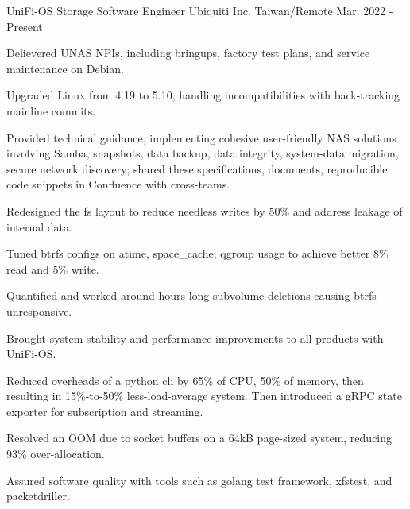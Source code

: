 

\begin{cventries}

  \cventry
    {UniFi-OS Storage Software Engineer} %
    {Ubiquiti Inc.} %
    {Taiwan/Remote} %
    {Mar. 2022 - Present} %
    {
      \begin{cvitems} %
        \item {Delievered UNAS NPIs, including bringups, factory test
          plans, and service maintenance on Debian.}
        \item Upgraded Linux from 4.19 to 5.10, handling incompatibilities with back-tracking mainline commits.
        \item Provided technical guidance, implementing cohesive user-friendly NAS solutions involving Samba, snapshots, data backup, data integrity, system-data migration, secure network discovery; shared these specifications, documents, reproducible code snippets in Confluence with cross-teams.
        \item Redesigned the fs layout to reduce needless writes by 50\% and address leakage of internal data.
        \item Tuned btrfs configs on atime, space\_cache, qgroup usage to achieve
        better 8\% read and 5\% write.
        \item Quantified and worked-around hours-long subvolume deletions causing btrfs unresponsive.
        \item Brought system stability and performance improvements to all products with UniFi-OS.
        \item Reduced overheads of a python cli by 65\% of CPU, 50\% of memory, then
        resulting in 15\%-to-50\% less-load-average system. Then introduced a gRPC state exporter for subscription and streaming.
        \item Resolved an OOM due to socket buffers on a 64kB page-sized system,
        reducing 93\% over-allocation.
        \item Assured software quality with tools such as golang test framework, xfstest, and packetdriller.
      \end{cvitems}
    }


\end{cventries}
